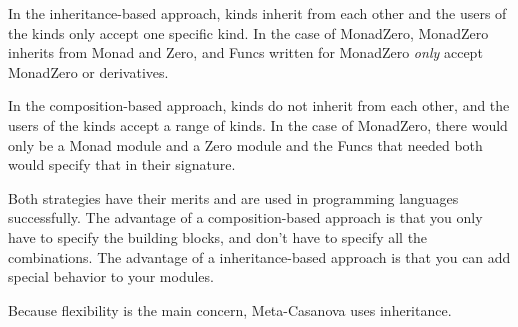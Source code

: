 In the inheritance-based approach, kinds inherit from each other and the users of the kinds only accept one specific kind.
In the case of MonadZero, MonadZero inherits from Monad and Zero, and Funcs written for MonadZero \textit{only} accept MonadZero or derivatives.

In the composition-based approach, kinds do not inherit from each other, and the users of the kinds accept a range of kinds.
In the case of MonadZero, there would only be a Monad module and a Zero module and the Funcs that needed both would specify that in their signature.

Both strategies have their merits and are used in programming languages successfully.
The advantage of a composition-based approach is that you only have to specify the building blocks,
and don't have to specify all the combinations.
The advantage of a inheritance-based approach is that you can add special behavior to your modules.

Because flexibility is the main concern, Meta-Casanova uses inheritance.
